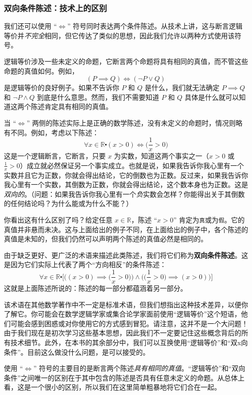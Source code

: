 \subsubsection*{双向条件陈述：技术上的区别}

我们还可以使用 ``$\iff$'' 符号同时表达两个条件陈述。从技术上讲，这与断言逻辑等价并\emph{不完全}相同，但它传达了类似的思想，因此我们允许以两种方式使用该符号。

逻辑等价涉及一些未定义的命题，它断言两个命题将具有相同的真值，而不管这些命题的真值如何。例如，
\[(P \implies Q) \iff (\neg P \lor Q)\]
是逻辑等价的良好例子。如果不告诉你 $P$ 和 $Q$ 是什么，我们就无法确定 $P \implies Q$ 和 $\neg P \land Q$ 到底是什么意思。然而，我们不需要知道 $P$ 和 $Q$ 具体是什么就可以知道这两个陈述肯定具有相同的真值。

当 ``$\iff$'' 两侧的陈述实际上是正确的数学陈述，没有未定义的命题时，情况则略有不同。例如，考虑以下陈述：
\[\forall x \in \mathbb{R} \centerdot (x > 0) \iff \Big(\frac{1}{x}>0\Big)\]
这是一个逻辑断言，它断言，只要 $x$ 为实数，知道这两个事实之一（$x > 0$ 或 $\frac{1}{x} > 0$）成立就必然保证另一个事实成立。也就是说，如果我告诉你我心里有一个实数并且它为正数，你就会得出结论，它的倒数也为正数。反过来，如果我告诉你我心里有一个实数，其倒数为正数，你就会得出结论，这个数本身也为正数。这是\emph{双向的}。（问题：如果我告诉你我心里有一个\emph{负}实数会怎样？你能得出关于其倒数的任何结论吗？为什么能或为什么不能？）

你看出这有什么区别了吗？给定任意 $x \in \mathbb{R}$，陈述 ``$x > 0$'' 肯定为\verb|真|或为\verb|假|。它的真值并非悬而未决。这与上面给出的例子不同，在上面给出的例子中，各个陈述的真值是未知的，但我们仍然可以声明两个陈述的真值必然是相同的。

由于缺乏更好、更广泛的术语来描述此类陈述，我们将它们称为\textbf{双向条件陈述}。这是因为它们实际上代表了两个``方向相反''的条件陈述：
\[\forall x \in \mathbb{R} \centerdot \Bigg[\Bigg((x > 0) \implies \Big(\frac{1}{x}>0\Big)\Bigg) \land \Bigg(\Big(\frac{1}{x}>0\Big) \implies (x > 0)\Bigg)\Bigg]\]
这就是上面陈述所说的：陈述的每一部分都蕴涵着另一部分。

该术语在其他数学著作中不一定是标准术语，但我们想指出这种技术差异，以便你了解它。你可能会在数学逻辑学家或集合论学家面前使用``逻辑等价''这个短语，他们可能会感到困惑或对你使用它的方式感到冒犯。请注意，这并不是一个大问题！由于我们现在是初次学习这些基本思想，因此我们不一定要记住这些概念背后的所有技术细节。此外，在本书的其余部分中，我们可以互换使用``逻辑等价''和``双x向条件''。目前这么做没什么问题，是可以接受的。

使用 ``$\iff$'' 符号的主要目的是断言两个陈述\emph{具有相同的真值}。``逻辑等价''和``双向条件''之间唯一的区别在于其中包含的陈述是否具有任意未定义的命题。从总体上看，这是一个很小的区别，所以我们在这里简单粗暴地将它们合在一起。

